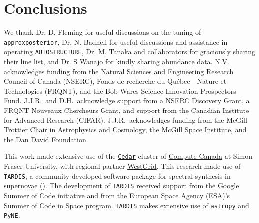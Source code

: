 \documentclass[twocolumn]{aastex63}
\begin{document}
\section{Conclusions}\label{sec:conclusions}

\acknowledgments
We thank Dr. D. Fleming for useful discussions on the tuning of \texttt{approxposterior}, Dr. N. Badnell for useful discussions and assistance in operating \texttt{AUTOSTRUCTURE}, Dr. M. Tanaka and collaborators for graciously sharing their line list, and Dr. S Wanajo for kindly sharing abundance data. N.V. acknowledges funding from the Natural Sciences and Engineering Research Council of Canada (NSERC), Fonds de recherche du Qu\'ebec - Nature et Technologies (FRQNT), and the Bob Wares Science Innovation Prospectors Fund. J.J.R.\ and D.H.\ acknowledge support from a NSERC Discovery Grant, a  FRQNT Nouveaux Chercheurs Grant, and support from the Canadian Institute for Advanced Research (CIFAR).  J.J.R.\ acknowledges funding from the McGill Trottier Chair in Astrophysics and Cosmology, the McGill Space Institute, and the Dan David Foundation.

This work made extensive use of the \href{https://docs.computecanada.ca/wiki/Cedar}{\texttt{Cedar}} cluster of \href{https://www.computecanada.ca/home/}{Compute Canada} at Simon Fraser University, with regional partner \href{https://www.westgrid.ca/}{WestGrid}. This research made use of \texttt{TARDIS}, a community-developed software package for spectral synthesis in supernovae (\citealt{kerzendorf14}). The development of \texttt{TARDIS} received support from the Google Summer of Code initiative and from the European Space Agency (ESA)'s Summer of Code in Space program. \texttt{TARDIS} makes extensive use of \texttt{astropy} and \texttt{PyNE}. 
\newline
\end{document}
